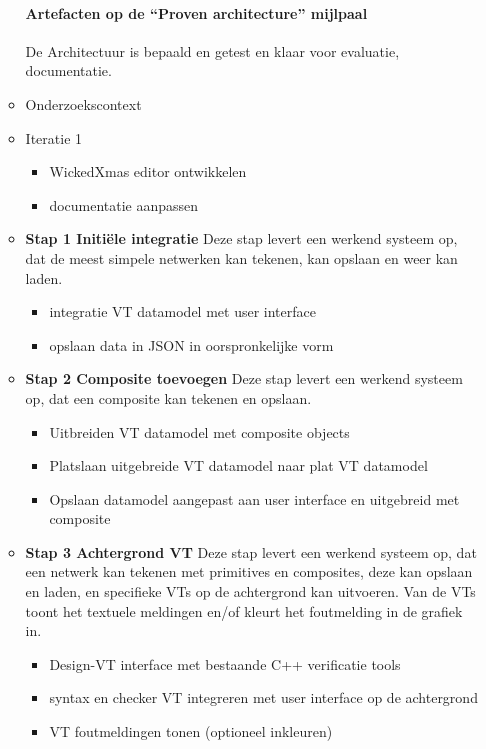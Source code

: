 \begin{enumerate}
\begin{itemize}
		\paragraph{Artefacten op de ``Proven architecture'' mijlpaal}
		 De Architectuur is bepaald en getest en klaar voor evaluatie, documentatie.
	\item Onderzoekscontext
	\item Iteratie 1
		\begin{itemize}
		\item WickedXmas editor ontwikkelen
		\item documentatie aanpassen
		\end{itemize}
	\item {\bf Stap 1\marginpar{[febr 2015]} Initi\"{e}le integratie}
		Deze stap levert een werkend systeem op, dat de meest simpele netwerken
		kan tekenen, kan opslaan en weer kan laden.
		\begin{itemize}
			\item integratie VT datamodel met user interface
			\item opslaan data in JSON in oorspronkelijke vorm
		\end{itemize}
	\item {\bf Stap 2\marginpar{[febr 2015]} Composite toevoegen}
		Deze stap levert een werkend systeem op, dat een composite kan tekenen en opslaan.
		\begin{itemize}
			\item Uitbreiden VT datamodel met composite objects
			\item Platslaan uitgebreide VT datamodel naar plat VT datamodel
			\item Opslaan datamodel aangepast aan user interface en uitgebreid met composite
		\end{itemize}
	\item {\bf Stap 3\marginpar{[febr 2015]} Achtergrond VT}
		Deze stap levert een werkend systeem op, dat een netwerk kan tekenen met primitives
		en composites, deze kan opslaan en laden, en specifieke VTs op de achtergrond kan
		uitvoeren. Van de VTs toont het textuele meldingen en/of kleurt het foutmelding in de grafiek in.
		\begin{itemize}
			\item Design-VT interface met bestaande C++ verificatie tools
			\item syntax en checker VT integreren met user interface op de achtergrond
			\item VT foutmeldingen tonen (optioneel inkleuren)
		\end{itemize}

\end{itemize}
\end{enumerate}
